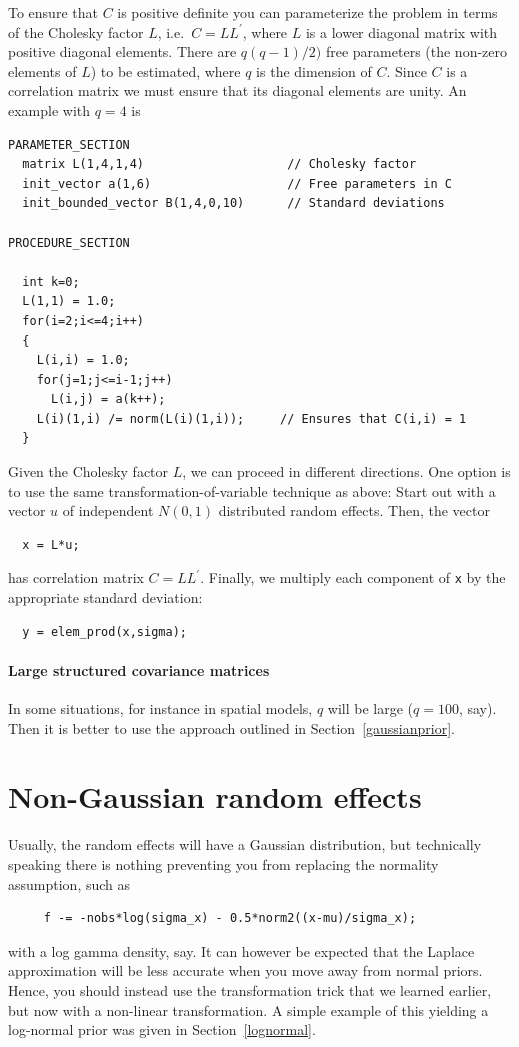 \documentclass[12pt,letter,reqno]{book}
\begin{document}
To ensure that $C$ is positive definite you can parameterize the problem in terms of
the Cholesky factor $L$, i.e.~$C=LL^\prime$, where $L$ is a lower diagonal matrix with positive diagonal elements.
There are $q(q-1)/2)$ free parameters (the non-zero elements of $L$) to be estimated, where $q$ is the dimension of $C$.
Since $C$ is a correlation matrix we must ensure that its diagonal elements are unity. An example with $q=4$ is
\begin{lstlisting}
PARAMETER_SECTION
  matrix L(1,4,1,4)                    // Cholesky factor
  init_vector a(1,6)                   // Free parameters in C
  init_bounded_vector B(1,4,0,10)      // Standard deviations
  
PROCEDURE_SECTION

  int k=0;
  L(1,1) = 1.0;
  for(i=2;i<=4;i++)
  {
    L(i,i) = 1.0;
    for(j=1;j<=i-1;j++)
      L(i,j) = a(k++);
    L(i)(1,i) /= norm(L(i)(1,i));     // Ensures that C(i,i) = 1
  }
\end{lstlisting}
Given the Cholesky factor $L$, we can proceed in different directions. One option is to use the same 
transformation-of-variable technique as above: 
Start out with a vector $u$ of independent $N(0,1)$ distributed random effects. Then, the vector
\begin{lstlisting}
  x = L*u;
\end{lstlisting}
has correlation matrix $C=LL^\prime$. Finally, we multiply each component of \texttt{x} by the 
appropriate standard deviation:
\begin{lstlisting}
  y = elem_prod(x,sigma);
\end{lstlisting}


\paragraph{Large structured covariance matrices} 
In some situations, for instance in spatial models, $q$ will be large ($q=100$, say). Then
it is better to use the approach outlined in Section~\ref{gaussianprior}.

\section{Non-Gaussian random effects}
Usually, the random effects will have a Gaussian distribution, but technically speaking there is nothing
preventing you from replacing the normality assumption, such as
\begin{lstlisting}
     f -= -nobs*log(sigma_x) - 0.5*norm2((x-mu)/sigma_x);
\end{lstlisting}
with a log gamma density, say. It can however be expected that the
Laplace approximation will be less accurate when you move away from
 normal priors. Hence, you should instead use the transformation trick that
we learned earlier, but now with a non-linear transformation.
A simple example of this yielding a log-normal prior was given in Section~\ref{lognormal}.
\end{document}
